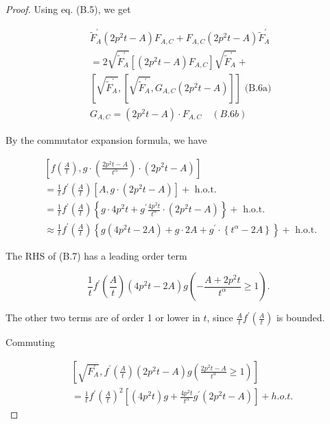 \documentclass[11pt]{article}
\begin{document}
\begin{proof}
Using eq. (B.5), we get

\begin{align*}
& \tilde{F}_{A}^{\prime}\left(2 p^{2}t-A\right) F_{A, C}+F_{A, C}\left(2 p^{2}t-A\right) \tilde{F}_{A}^{\prime} \\
& =2 \sqrt{\tilde{F}_{A}^{\prime}}\left[\left(2 p^{2}t-A\right) F_{A, C}\right] \sqrt{\tilde{F}_{A}^{\prime}}+ \\
& {\left[\sqrt{\tilde{F}_{A}^{\prime}},\left[\sqrt{\tilde{F}_{A}^{\prime}}, G_{A, C}\left(2 p^{2} t-A\right)\right]\right] \text { (B.6a) }} \\
& G_{A, C}=\left(2 p^{2} t-A\right) \cdot F_{A, C} \quad(B .6 b) \tag{B.6}
\end{align*}


By the commutator expansion formula, we have

\begin{align*}
& {\left[f\left(\frac{A}{t}\right), g\cdot\left(\frac{2 p^{2} t-A}{t^{\alpha}}\right) \cdot\left(2 p^{2} t-A\right)\right]}  \tag{B.7}\\
& =\frac{1}{t} f^{\prime}\left(\frac{A}{t}\right)\left[A, g \cdot\left(2 p^{2} t-A\right)\right]+ \text { h.o.t. } \\
& =\frac{1}{t} f^{\prime}\left(\frac{A}{t}\right)\left\{g \cdot 4 p^{2} t+g^{\prime} \frac{4 p^{2} t}{t^{\alpha}} \cdot\left(2 p^{2} t-A\right)\right\}+\text { h.o.t. } \\
& \approx \frac{1}{t} f^{\prime}\left(\frac{A}{t}\right)\left\{g\left(4 p^{2} t-2 A\right)+g \cdot 2A+g^{\prime} \cdot\left\{t^{\alpha}-2 A\right\}\right\}+ \text { h.o.t. }
\end{align*}


The RHS of (B.7) has a leading order term

\begin{equation*}
\frac{1}{t} f^{\prime}\left(\frac{A}{t}\right)\left(4 p^{2} t-2 A\right) g\left(-\frac{A+2 p^{2} t}{t^{\alpha}} \geqslant 1\right) . \tag{B.8}
\end{equation*}


The other two terms are of order 1 or lower in $t$, since $\frac{A}{t} f^{\prime}\left(\frac{A}{t}\right)$ is bounded.

Commuting

\begin{align*}
& {\left[\sqrt{F_{A}^{\prime}}, f^{\prime}\left(\frac{A}{t}\right)\left(2 p^{2} t-A\right) g\left(\frac{2 p^{2} t-A}{t^{\alpha}} \geqslant 1\right)\right]} \\
& =\frac{1}{t} f^{\prime}\left(\frac{A}{t}\right)^{2}\left[\left(4 p^{2} t\right) g+\frac{4 p^{2} t}{t^{\alpha}} g^{\prime}\left(2 p^{2} t-A\right)\right]+h .o . t . \tag{B.9}
\end{align*}



\end{proof}
\end{document}
